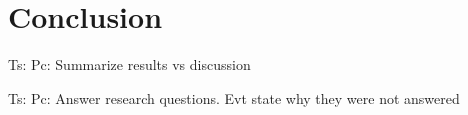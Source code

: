 \section{Conclusion}

Ts: 
Pc: Summarize results vs discussion

Ts: 
Pc: Answer research questions. Evt state why they were not answered
